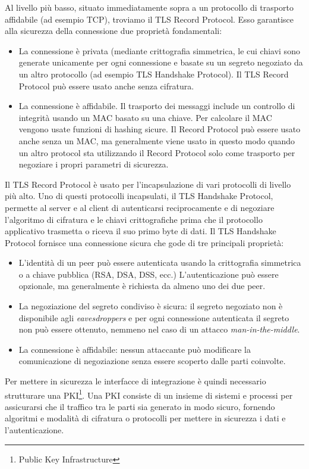 \documentclass[../main.tex]{subfiles}
\begin{document}
Al livello più basso, situato immediatamente sopra a un protocollo di trasporto affidabile (ad esempio TCP), troviamo il TLS Record Protocol.
Esso garantisce alla sicurezza della connessione due proprietà fondamentali:
\begin{itemize}
\item La connessione è privata (mediante crittografia simmetrica, le cui chiavi sono generate unicamente per ogni connessione e basate su un segreto negoziato da un altro protocollo (ad esempio TLS Handshake Protocol).
Il TLS Record Protocol può essere usato anche senza cifratura.
\item La connessione è affidabile. Il trasporto dei messaggi include un controllo di integrità usando un MAC basato su una chiave. Per calcolare il MAC vengono usate funzioni di hashing sicure. Il Record Protocol può essere usato anche senza un MAC, ma generalmente viene usato in questo modo quando un altro protocol sta utilizzando il Record Protocol solo come trasporto per negoziare i propri parametri di sicurezza.
\end{itemize}
Il TLS Record Protocol è usato per l'incapsulazione di vari protocolli di livello più alto. Uno di questi protocolli incapsulati, il TLS Handshake Protocol, permette al server e al client di autenticarsi reciprocamente e di negoziare l'algoritmo di cifratura e le chiavi crittografiche prima che il protocollo applicativo trasmetta o riceva il suo primo byte di dati. Il TLS Handshake Protocol fornisce una connessione sicura che gode di tre principali proprietà:
\begin{itemize}
\item L'identità di un peer può essere autenticata usando la crittografia simmetrica o a chiave pubblica (RSA, DSA, DSS, ecc.) L'autenticazione può essere opzionale, ma generalmente è richiesta da almeno uno dei due peer.
\item La negoziazione del segreto condiviso è sicura: il segreto negoziato non è disponibile agli \textit{eavesdroppers} e per ogni connessione autenticata il segreto non può essere ottenuto, nemmeno nel caso di un attacco \textit{man-in-the-middle}.
\item La connessione è affidabile: nessun attaccante può modificare la comunicazione di negoziazione senza essere scoperto dalle parti coinvolte.
\end{itemize}

Per mettere in sicurezza le interfacce di integrazione è quindi necessario strutturare una PKI\footnote{Public Key Infrastructure}.
Una PKI consiste di un insieme di sistemi e processi per assicurarsi che il traffico tra le parti sia generato in modo sicuro, fornendo algoritmi e modalità di cifratura o protocolli per mettere in sicurezza i dati e l'autenticazione.\cite{OpenStackSecurity}
\end{document}
